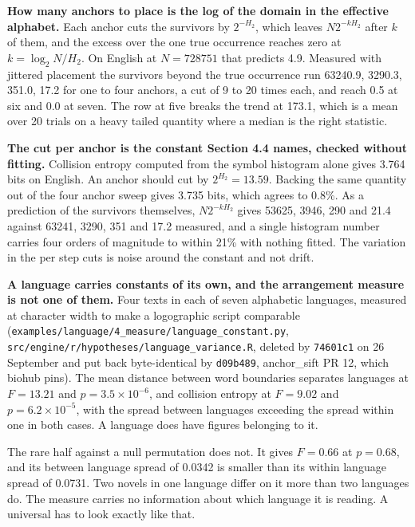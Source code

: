 \textbf{How many anchors to place is the log of the domain in the effective alphabet.} Each anchor cuts the survivors by \(2^{-H_2}\), which leaves \(N 2^{-kH_2}\) after \(k\) of them, and the excess over the one true occurrence reaches zero at \(k = \log_2 N / H_2\). On English at \(N = 728751\) that predicts 4.9. Measured with jittered placement the survivors beyond the true occurrence run 63240.9, 3290.3, 351.0, 17.2 for one to four anchors, a cut of 9 to 20 times each, and reach 0.5 at six and 0.0 at seven. The row at five breaks the trend at 173.1, which is a mean over 20 trials on a heavy tailed quantity where a median is the right statistic.

\textbf{The cut per anchor is the constant Section 4.4 names, checked without fitting.} Collision entropy computed from the symbol histogram alone gives 3.764 bits on English. An anchor should cut by \(2^{H_2} = 13.59\). Backing the same quantity out of the four anchor sweep gives 3.735 bits, which agrees to 0.8\%. As a prediction of the survivors themselves, \(N 2^{-kH_2}\) gives 53625, 3946, 290 and 21.4 against 63241, 3290, 351 and 17.2 measured, and a single histogram number carries four orders of magnitude to within 21\% with nothing fitted. The variation in the per step cuts is noise around the constant and not drift.

\textbf{A language carries constants of its own, and the arrangement measure is not one of them.} Four texts in each of seven alphabetic languages, measured at character width to make a logographic script comparable (\texttt{examples/\allowbreak{}language/\allowbreak{}4\_\allowbreak{}measure/\allowbreak{}language\_\allowbreak{}constant.\allowbreak{}py}, \texttt{src/\allowbreak{}engine/\allowbreak{}r/\allowbreak{}hypotheses/\allowbreak{}language\_\allowbreak{}variance.\allowbreak{}R}, deleted by \texttt{74601c1} on 26 September and put back byte-identical by \texttt{d09b489}, anchor\_sift PR 12, which biohub pins). The mean distance between word boundaries separates languages at \(F = 13.21\) and \(p = 3.5 \times 10^{-6}\), and collision entropy at \(F = 9.02\) and \(p = 6.2 \times 10^{-5}\), with the spread between languages exceeding the spread within one in both cases. A language does have figures belonging to it.

The rare half against a null permutation does not. It gives \(F = 0.66\) at \(p = 0.68\), and its between language spread of 0.0342 is smaller than its within language spread of 0.0731. Two novels in one language differ on it more than two languages do. The measure carries no information about which language it is reading. A universal has to look exactly like that.


